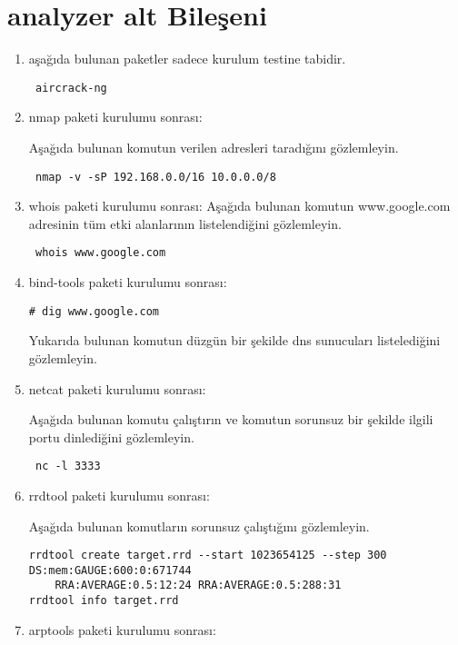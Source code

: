 \documentclass[a4paper,10pt]{article}
\begin{document}
\section{analyzer alt Bileşeni}
\begin{enumerate}
\item aşağıda bulunan paketler sadece kurulum testine tabidir.
\begin{verbatim}
 aircrack-ng
\end{verbatim}

\item nmap paketi kurulumu sonrası:

Aşağıda bulunan komutun verilen adresleri taradığını gözlemleyin.
\begin{verbatim}
 nmap -v -sP 192.168.0.0/16 10.0.0.0/8
\end{verbatim}

 
\item whois paketi kurulumu sonrası:
Aşağıda bulunan komutun www.google.com adresinin tüm etki alanlarının listelendiğini gözlemleyin.
\begin{verbatim}
 whois www.google.com
\end{verbatim}


\item bind-tools paketi kurulumu sonrası:

\begin{verbatim}
# dig www.google.com
\end{verbatim}
Yukarıda bulunan komutun düzgün bir şekilde dns sunucuları listelediğini gözlemleyin.

\item netcat paketi kurulumu sonrası:

Aşağıda bulunan komutu çalıştırın ve komutun sorunsuz bir şekilde ilgili portu dinlediğini gözlemleyin.
\begin{verbatim}
 nc -l 3333 
\end{verbatim}

\item rrdtool paketi kurulumu sonrası:

Aşağıda bulunan komutların sorunsuz çalıştığını gözlemleyin.
\begin{verbatim}
rrdtool create target.rrd --start 1023654125 --step 300 DS:mem:GAUGE:600:0:671744  
	RRA:AVERAGE:0.5:12:24 RRA:AVERAGE:0.5:288:31 
rrdtool info target.rrd
\end{verbatim}


\item arptools paketi kurulumu sonrası:


\end{enumerate}
\end{document}
